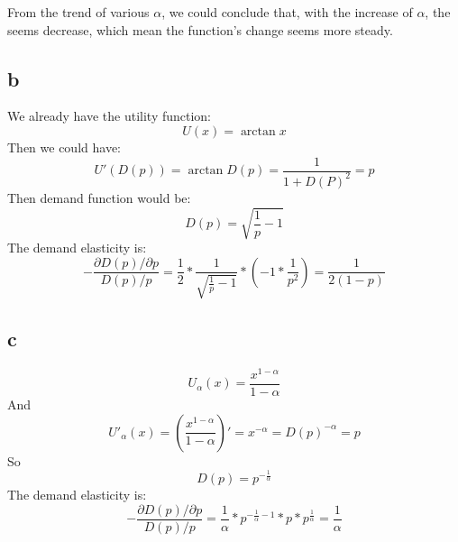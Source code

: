 \documentclass[12pt,a4paper]{article}
\begin{document}
From the trend of various $\alpha$, we could conclude that, with the increase of $\alpha$, the seems decrease, which mean the function's change seems more steady. 

\subsection{b}
We already have the utility function:
\begin{equation}
U(x) = \arctan{x}
\end{equation}
Then we could have:
\begin{equation}
U'(D(p)) = \arctan{D(p)} = \frac{1}{1+D(P)^{2}} = p
\end{equation}
Then demand function would be:
\begin{equation}
D(p) = \sqrt{\frac{1}{p} - 1}
\end{equation}
The demand elasticity is:
\begin{equation}
-\frac{\partial D(p) / \partial p}{D(p)/p} = \frac{1}{2}*\frac{1}{\sqrt{\frac{1}{p}-1}} * (-1*\frac{1}{p^2}) =\frac{1}{2(1-p)}
\end{equation}
\subsection{c}
\begin{equation}
U_{\alpha}(x) = \frac{x^{1-\alpha}}{1-\alpha}
\end{equation}
And
\begin{equation}
U'_{\alpha}(x) = (\frac{x^{1-\alpha}}{1-\alpha})' = x^{-\alpha} = D(p)^{-\alpha} = p
\end{equation}
So
\begin{equation}
D(p)= p^{-\frac{1}{\alpha}}
\end{equation}
The demand elasticity is:
\begin{equation}
-\frac{\partial D(p) / \partial p}{D(p)/p} = \frac{1}{\alpha}*p^{-\frac{1}{\alpha}-1}*p*p^{\frac{1}{\alpha}} = \frac{1}{\alpha}
\end{equation}
\end{document}
